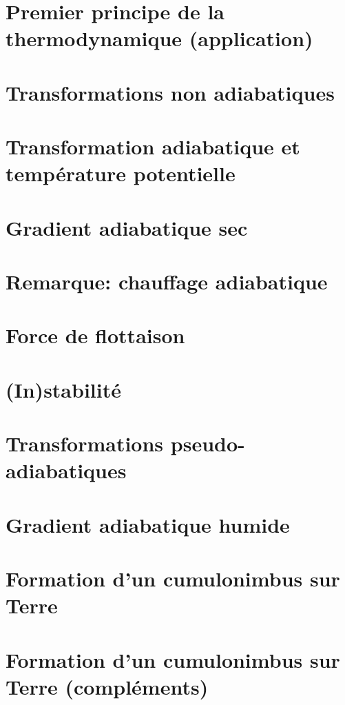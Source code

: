 \documentclass[a4paper,DIV16,10pt]{scrartcl}
\begin{document}
\newpage
\section{Premier principe de la thermodynamique (application)}

\section{Transformations non adiabatiques}


\newpage
\section{Transformation adiabatique et température potentielle}

\section{Gradient adiabatique sec}

\section{Remarque: chauffage adiabatique}


\newpage
\section{Force de flottaison}


\newpage
\section{(In)stabilité}


\newpage
\section{Transformations pseudo-adiabatiques}


\newpage
\section{Gradient adiabatique humide}


\newpage
\section{Formation d'un cumulonimbus sur Terre}


\newpage
\section{Formation d'un cumulonimbus sur Terre (compléments)}

\end{document}
